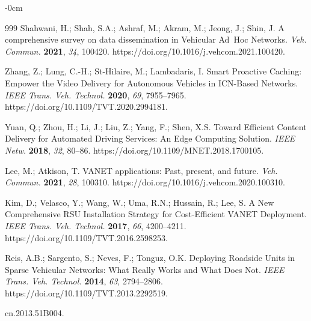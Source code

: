 \documentclass[sensors,aricle,accept,pdftex,moreauthors]{Definitions/mdpi}
\begin{document}
{\begin{adjustwidth}{-\extralength}{0cm}

\begin{thebibliography}{999} %
{} Shahwani, H.; Shah, S.A.; Ashraf, M.; Akram, M.; Jeong, J.; Shin, J. A comprehensive survey on data dissemination in Vehicular Ad~Hoc Networks. {\em Veh. Commun.} {\bf 2021}, {\em 34}, 100420. https://doi.org/10.1016/j.vehcom.2021.100420.

 Zhang, Z.; Lung, C.-H.; St-Hilaire, M.; Lambadaris, I. Smart Proactive Caching: Empower the Video Delivery for Autonomous Vehicles in ICN-Based Networks. {\em IEEE Trans. Veh. Technol.} {\bf 2020}, {\em 69}, 7955--7965. https://doi.org/10.1109/TVT.2020.2994181.

 Yuan, Q.; Zhou, H.; Li, J.; Liu, Z.; Yang, F.; Shen, X.S. Toward Efficient Content Delivery for Automated Driving Services: An Edge Computing Solution. {\em IEEE Netw.} {\bf 2018}, {\em 32}, 80--86. https://doi.org/10.1109/MNET.2018.1700105.

 Lee, M.; Atkison, T. VANET applications: Past, present, and future. {\em Veh. Commun.} {\bf 2021}, {\em 28}, 100310. https://doi.org/10.1016/j.\linebreak vehcom.2020.100310.

 Kim, D.; Velasco, Y.; Wang, W.; Uma, R.N.; Hussain, R.; Lee, S. A New Comprehensive RSU Installation Strategy for Cost-Efficient VANET Deployment. {\em IEEE Trans. Veh. Technol.} {\bf 2017}, {\em 66}, 4200--4211. https://doi.org/10.1109/TVT.2016.2598253.

 Reis, A.B.; Sargento, S.; Neves, F.; Tonguz, O.K. Deploying Roadside Units in Sparse Vehicular Networks: What Really Works and What Does Not. {\em IEEE Trans. Veh. Technol.} {\bf 2014}, {\em 63}, 2794--2806. https://doi.org/10.1109/TVT.2013.2292519.

  cn.2013.51B004.


\end{thebibliography}
\end{adjustwidth}}
\end{document}
